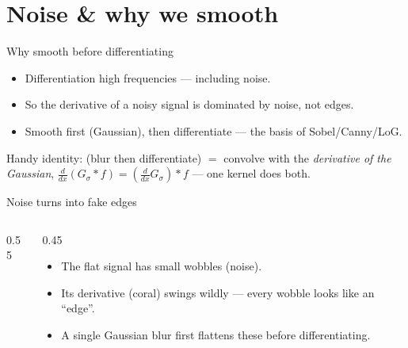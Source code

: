 \documentclass[10pt,aspectratio=169]{beamer}
\begin{document}
\section{Noise \& why we smooth}

\begin{frame}{Why smooth before differentiating}
  \begin{itemize}
    \item Differentiation  high frequencies — including noise.
    \item So the derivative of a noisy signal is dominated by noise, not edges.
    \item Smooth first (Gaussian), then differentiate — the basis of Sobel/Canny/LoG.
  \end{itemize}
  \begin{mathbox}
    Handy identity: (blur then differentiate) $=$ convolve with the \emph{derivative of the Gaussian},
    $\frac{d}{dx}(G_\sigma * f) = (\tfrac{d}{dx}G_\sigma) * f$ — one kernel does both.
  \end{mathbox}
\end{frame}

\begin{frame}{Noise turns into fake edges}
  \begin{columns}[T]
    \begin{column}{0.55\textwidth}
    \end{column}
    \begin{column}{0.45\textwidth}
      \begin{itemize}
        \item The flat signal has small wobbles (noise).
        \item Its derivative (coral) swings wildly — every wobble looks like an ``edge''.
        \item A single Gaussian blur first flattens these before differentiating.
      \end{itemize}
    \end{column}
  \end{columns}
\end{frame}
\end{document}
